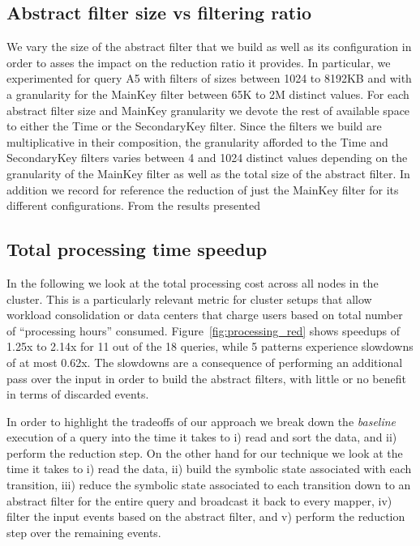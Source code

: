 \subsection{Abstract filter size vs filtering ratio}

We vary the size of the abstract filter that we build as well as its
configuration in order to asses the impact on the reduction ratio it provides.
In particular, we experimented for query A5 with filters of sizes between 1024
to 8192KB and with a granularity for the MainKey filter between 65K to 2M
distinct values. For each abstract filter size and MainKey granularity we devote
the rest of available space to either the Time or the SecondaryKey filter.
Since the filters we build are multiplicative in their composition, the
granularity afforded to the Time and SecondaryKey filters varies between 4 and
1024 distinct values depending on the granularity of the MainKey filter as well
as the total size of the abstract filter.
In addition we record for reference the reduction of just the MainKey filter for
its different configurations.
From the results presented 



\subsection{Total processing time speedup}

In the following we look at the total processing cost across all nodes in the
cluster.
This is a particularly relevant metric for cluster setups that allow workload
consolidation or data centers that charge users based on total number of
``processing hours'' consumed.
Figure~\ref{fig:processing_red} shows speedups of 1.25x to 2.14x for 11 out of
the 18 queries, while 5 patterns experience slowdowns of at most 0.62x.
The slowdowns are a consequence of performing an additional pass over the input
in order to build the abstract filters, with little or no benefit in terms of
discarded events.

In order to highlight the tradeoffs of our approach we break down the {\em
baseline} execution of a query into the time it takes to 
i) read and sort the data, and 
ii) perform the reduction step.
On the other hand for our technique we look at the time it takes to 
i) read the data, 
ii) build the symbolic state associated with each transition,
iii) reduce the symbolic state associated to each transition down to an abstract
filter for the entire query and broadcast it back to every mapper,
iv) filter the input events based on the abstract filter, and
v) perform the reduction step over the remaining events. 

